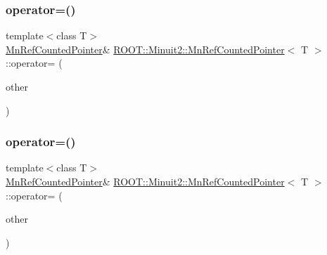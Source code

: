 \subsubsection{\texorpdfstring{operator=()}{operator=()}\hspace{0.1cm}{\footnotesize\ttfamily [2/6]}}
{\footnotesize\ttfamily template$<$class T$>$ \\
\mbox{\hyperlink{classROOT_1_1Minuit2_1_1MnRefCountedPointer}{Mn\+Ref\+Counted\+Pointer}}\& \mbox{\hyperlink{classROOT_1_1Minuit2_1_1MnRefCountedPointer}{R\+O\+O\+T\+::\+Minuit2\+::\+Mn\+Ref\+Counted\+Pointer}}$<$ T $>$\+::operator= (\begin{DoxyParamCaption}\item[{const \mbox{\hyperlink{classROOT_1_1Minuit2_1_1MnRefCountedPointer}{Mn\+Ref\+Counted\+Pointer}}$<$ T $>$ \&}]{other }\end{DoxyParamCaption})\hspace{0.3cm}{\ttfamily [inline]}}

\mbox{\label{classROOT_1_1Minuit2_1_1MnRefCountedPointer_a6a7380791625cf84a89a3b4fa32b7029}} 
\subsubsection{\texorpdfstring{operator=()}{operator=()}\hspace{0.1cm}{\footnotesize\ttfamily [3/6]}}
{\footnotesize\ttfamily template$<$class T$>$ \\
\mbox{\hyperlink{classROOT_1_1Minuit2_1_1MnRefCountedPointer}{Mn\+Ref\+Counted\+Pointer}}\& \mbox{\hyperlink{classROOT_1_1Minuit2_1_1MnRefCountedPointer}{R\+O\+O\+T\+::\+Minuit2\+::\+Mn\+Ref\+Counted\+Pointer}}$<$ T $>$\+::operator= (\begin{DoxyParamCaption}\item[{const \mbox{\hyperlink{classROOT_1_1Minuit2_1_1MnRefCountedPointer}{Mn\+Ref\+Counted\+Pointer}}$<$ T $>$ \&}]{other }\end{DoxyParamCaption})\hspace{0.3cm}{\ttfamily [inline]}}

\mbox{\label{classROOT_1_1Minuit2_1_1MnRefCountedPointer_a6867125c7f9d76199e7a6676eed5f682}} 
